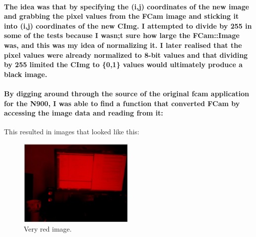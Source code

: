 \paragraph{The idea was that by specifying the (i,j) coordinates of the new image and grabbing the pixel values from the FCam image and sticking it into (i,j) coordinates of the new CImg. I attempted to divide by 255 in some of the tests because I wasn;t sure how large the FCam::Image was, and this was my idea of normalizing it. I later realised that the pixel values were already normalized to 8-bit values and that dividing by 255 limited the CImg to \{0,1\} values would ultimately produce a black image.}
\paragraph{By digging around through the source of the original fcam application for the N900, I was able to find a function that converted FCam by accessing the image data and reading from it:}
\begin{frame}[fragile]

\end{frame}
This resulted in images that looked like this:
\begin{center}
\begin{figure}
	\vspace{-20pt}
	\hspace{70pt}
		\includegraphics[width=0.5\textwidth]{../images/redbuffer1}
	\vspace{-20pt}
	\caption{Very red image.}
\end{figure}
\end{center}
